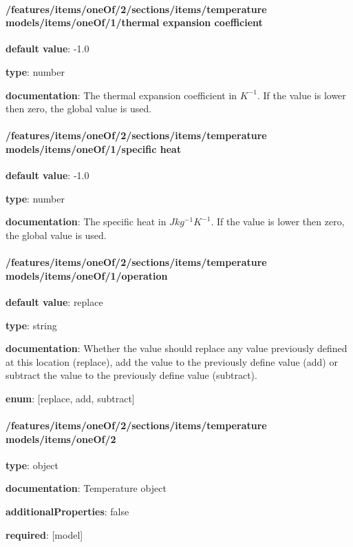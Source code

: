 \begin{itemized}
\end{itemized}\paragraph{/features/items/oneOf/2/sections/items/temperature models/items/oneOf/1/thermal expansion coefficient} \begin{itemized}
\item {\bf default value}: -1.0
\item {\bf type}: number
\item {\bf documentation}: The thermal expansion coefficient in $K^{-1}$. If the value is lower then zero, the global value is used.
\end{itemized}\paragraph{/features/items/oneOf/2/sections/items/temperature models/items/oneOf/1/specific heat} \begin{itemized}
\item {\bf default value}: -1.0
\item {\bf type}: number
\item {\bf documentation}: The specific heat in $J kg^{-1} K^{-1}$. If the value is lower then zero, the global value is used.
\end{itemized}\paragraph{/features/items/oneOf/2/sections/items/temperature models/items/oneOf/1/operation} \begin{itemized}
\item {\bf default value}: replace
\item {\bf type}: string
\item {\bf documentation}: Whether the value should replace any value previously defined at this location (replace), add the value to the previously define value (add) or subtract the value to the previously define value (subtract).
\item {\bf enum}: [replace, add, subtract]\end{itemized}\paragraph{/features/items/oneOf/2/sections/items/temperature models/items/oneOf/2} \begin{itemized}
\item {\bf type}: object
\item {\bf documentation}: Temperature object
\item {\bf additionalProperties}: false
\item {\bf required}: [model]\end{itemized}
